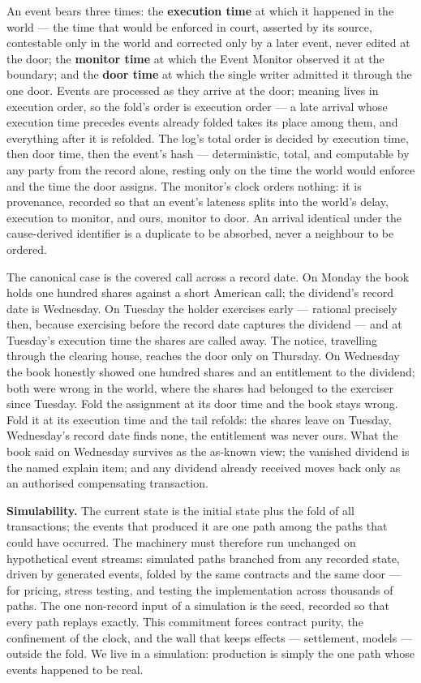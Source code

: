 \documentclass[11pt,a4paper]{article}
\newcommand{\clabel}[1]{\leavevmode\hypertarget{clause-#1}{}%
  \marginpar{\raggedright\scriptsize\ttfamily\textcolor{gray}{#1}}}
\begin{document}
An event bears three times: the \textbf{execution time} at which it
happened in the world --- the time that would be enforced in court,
asserted by its source, contestable only in the world and corrected
only by a later event, never edited at the door; the \textbf{monitor
time} at which the Event Monitor observed it at the boundary; and the
\textbf{door time} at which the single writer admitted it through the
one door. Events are processed as they arrive at the door; meaning
lives in execution order, so the fold's order is execution order --- a
late arrival whose execution time precedes events already folded takes
its place among them, and everything after it is refolded. The log's
total order is decided by execution time, then door time, then the
event's hash --- deterministic, total, and computable by any party from
the record alone, resting only on the time the world would enforce and
the time the door assigns. The monitor's clock orders nothing: it is
provenance, recorded so that an event's lateness splits into the
world's delay, execution to monitor, and ours, monitor to door. An
arrival identical under the cause-derived identifier is a duplicate to
be absorbed, never a neighbour to be ordered.

The canonical case is the covered call across a record date. On Monday
the book holds one hundred shares against a short American call; the
dividend's record date is Wednesday. On Tuesday the holder exercises
early --- rational precisely then, because exercising before the record
date captures the dividend --- and at Tuesday's execution time the
shares are called away. The notice, travelling through the clearing
house, reaches the door only on Thursday. On Wednesday the book
honestly showed one hundred shares and an entitlement to the dividend;
both were wrong in the world, where the shares had belonged to the
exerciser since Tuesday. Fold the assignment at its door time and the
book stays wrong. Fold it at its execution time and the tail refolds:
the shares leave on Tuesday, Wednesday's record date finds none, the
entitlement was never ours. What the book said on Wednesday survives as
the as-known view; the vanished dividend is the named explain item; and
any dividend already received moves back only as an authorised
compensating transaction.

\clabel{C-2.8}\textbf{Simulability.} The current state is the initial
state plus the fold of all transactions; the events that produced it are
one path among the paths that could have occurred. The machinery must
therefore run unchanged on hypothetical event streams: simulated paths
branched from any recorded state, driven by generated events, folded by
the same contracts and the same door --- for pricing, stress testing,
and testing the implementation across thousands of paths. The one
non-record input of a simulation is the seed, recorded so that every
path replays exactly. This commitment forces contract purity, the
confinement of the clock, and the wall that keeps effects --- settlement,
models --- outside the fold. We live in a simulation: production is
simply the one path whose events happened to be real.
\end{document}
